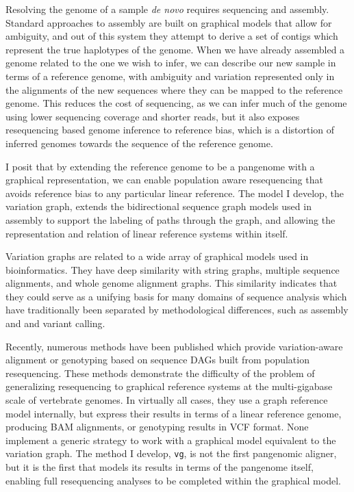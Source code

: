 Resolving the genome of a sample \emph{de novo} requires sequencing and assembly.
Standard approaches to assembly are built on graphical models that allow for ambiguity, and out of this system they attempt to derive a set of contigs which represent the true haplotypes of the genome.
When we have already assembled a genome related to the one we wish to infer, we can describe our new sample in terms of a reference genome, with ambiguity and variation represented only in the alignments of the new sequences where they can be mapped to the reference genome.
This reduces the cost of sequencing, as we can infer much of the genome using lower sequencing coverage and shorter reads, but it also exposes resequencing based genome inference to reference bias, which is a distortion of inferred genomes towards the sequence of the reference genome.

I posit that by extending the reference genome to be a pangenome with a graphical representation, we can enable population aware resequencing that avoids reference bias to any particular linear reference.
The model I develop, the variation graph, extends the bidirectional sequence graph models used in assembly to support the labeling of paths through the graph, and allowing the representation and relation of linear reference systems within itself.

Variation graphs are related to a wide array of graphical models used in bioinformatics.
They have deep similarity with string graphs, multiple sequence alignments, and whole genome alignment graphs.
This similarity indicates that they could serve as a unifying basis for many domains of sequence analysis which have traditionally been separated by methodological differences, such as assembly and and variant calling.

Recently, numerous methods have been published which provide variation-aware alignment or genotyping based on sequence DAGs built from population resequencing.
These methods demonstrate the difficulty of the problem of generalizing resequencing to graphical reference systems at the multi-gigabase scale of vertebrate genomes.
In virtually all cases, they use a graph reference model internally, but express their results in terms of a linear reference genome, producing BAM alignments, or genotyping results in VCF format.
None implement a generic strategy to work with a graphical model equivalent to the variation graph.
The method I develop, {\tt vg}, is not the first pangenomic aligner, but it is the first that models its results in terms of the pangenome itself, enabling full resequencing analyses to be completed within the graphical model.

